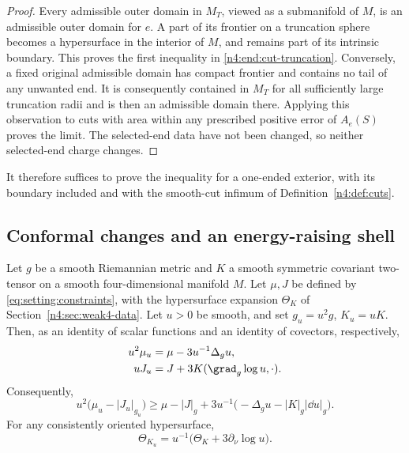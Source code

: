 \begin{proof}
Every admissible outer domain in \(M_T\), viewed as a submanifold of
\(M\), is an admissible outer domain for \(e\). A part of its frontier
on a truncation sphere becomes a hypersurface in the interior of \(M\),
and remains part of its intrinsic boundary. This proves the first
inequality in \eqref{n4:end:cut-truncation}. Conversely, a fixed original
admissible domain has compact frontier and contains no tail of any
unwanted end. It is consequently contained in \(M_T\) for all
sufficiently large truncation radii and is then an admissible domain
there. Applying this observation to cuts with area within any prescribed
positive error of \(A_e(S)\) proves the limit. The selected-end data have
not been changed, so neither selected-end charge changes.
\end{proof}

It therefore suffices to prove the inequality for a one-ended exterior,
with its boundary included and with the smooth-cut infimum of
Definition~\ref{n4:def:cuts}.

\subsection{Conformal changes and an energy-raising shell}

\begin{lemma}\label{n4:lem:conformal}
Let \(g\) be a smooth Riemannian metric and \(K\) a smooth symmetric
covariant two-tensor on a smooth four-dimensional manifold \(M\).
Let \(\mu,J\) be defined by \eqref{eq:setting:constraints}, with the
hypersurface expansion \(\Theta_K\) of Section~\ref{n4:sec:weak4-data}.
Let \(u>0\) be smooth, and set \(g_u=u^2g\), \(K_u=uK\).
Then, as an identity of scalar functions and an identity of covectors,
respectively,
\begin{align}
 u^2\mu_u&=\mu-3u^{-1}\Delta_g u,\label{n4:end:conformal-mu}\\
 uJ_u&=J+3K(\grad_g\log u,\cdot).\label{n4:end:conformal-J}
\end{align}
Consequently,
\begin{equation}\label{n4:end:conformal-dec}
 u^2\bigl(\mu_u-|J_u|_{g_u}\bigr)
 \ge \mu-|J|_g+3u^{-1}
          \bigl(-\Delta_g u-|K|_g|\dd u|_g\bigr).
\end{equation}
For any consistently oriented hypersurface,
\begin{equation}\label{n4:end:conformal-expansion}
 \Theta_{K_u}=u^{-1}
       \bigl(\Theta_K+3\partial_\nu\log u\bigr).
\end{equation}
\end{lemma}

